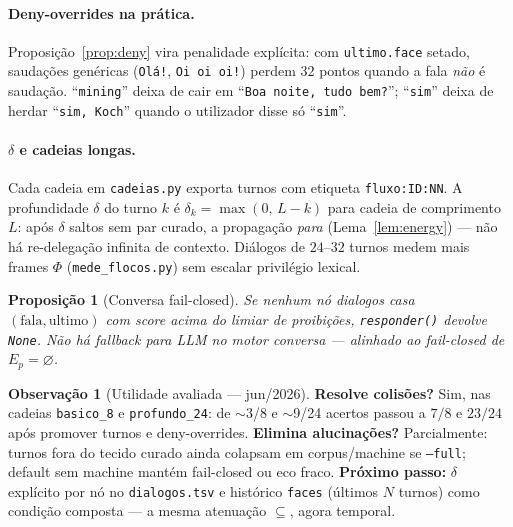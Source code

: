 \documentclass[11pt]{article}
\newtheorem{proposition}[theorem]{Proposição}
\theoremstyle{definition}
\newtheorem{remark}[theorem]{Observação}
\newcommand{\dep}{\delta}
\begin{document}
  \paragraph{Deny-overrides na prática.}
  Proposição~\ref{prop:deny} vira penalidade explícita: com \texttt{ultimo.face}
  setado, saudações genéricas (\texttt{Olá!}, \texttt{Oi oi oi!}) perdem $32$
  pontos quando a fala \emph{não} é saudação. ``\texttt{mining}'' deixa de cair
  em ``\texttt{Boa noite, tudo bem?}''; ``\texttt{sim}'' deixa de herdar
  ``\texttt{sim, Koch}'' quando o utilizador disse só ``\texttt{sim}''.

  \paragraph{$\dep$ e cadeias longas.}
  Cada cadeia em \texttt{cadeias.py} exporta turnos com etiqueta
  \texttt{fluxo:ID:NN}. A profundidade $\dep$ do turno $k$ é
  $\dep_k=\max(0,\,L-k)$ para cadeia de comprimento $L$: após $\dep$ saltos sem
  par curado, a propagação \emph{para} (Lema~\ref{lem:energy}) --- não há
  re-delegação infinita de contexto. Diálogos de $24$--$32$ turnos medem mais
  frames $\Phi$ (\texttt{mede\_flocos.py}) sem escalar privilégio lexical.

  \begin{proposition}[Conversa fail-closed]\label{prop:tiffany-fail}
  Se nenhum nó dialogos casa $(\text{fala},\text{ultimo})$ com score acima do
  limiar de proibições, \texttt{responder()} devolve \texttt{None}. Não há
  fallback para LLM no motor conversa --- alinhado ao fail-closed de
  $E_p=\varnothing$.
  \end{proposition}

  \begin{remark}[Utilidade avaliada --- jun/2026]
  \textbf{Resolve colisões?} Sim, nas cadeias \texttt{basico\_8} e
  \texttt{profundo\_24}: de $\sim$3/8 e $\sim$9/24 acertos passou a
  $7/8$ e $23/24$ após promover turnos e deny-overrides. \textbf{Elimina
  alucinações?} Parcialmente: turnos fora do tecido curado ainda colapsam em
  corpus/machine se \texttt{--full}; default sem machine mantém fail-closed ou
  eco fraco. \textbf{Próximo passo:} $\dep$ explícito por nó no
  \texttt{dialogos.tsv} e histórico \texttt{faces} (últimos $N$ turnos) como
  condição composta --- a mesma atenuação $\subseteq$, agora temporal.
  \end{remark}

  \appendix

\end{document}

